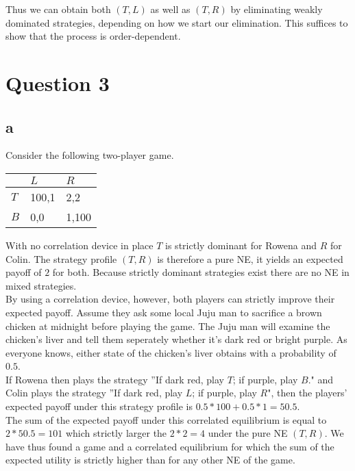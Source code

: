 \documentclass[10pt,a4paper]{article}
\begin{document}
Thus we can obtain both $(T,L)$ as well as $(T,R)$ by eliminating weakly dominated strategies, depending on how we start our elimination. This suffices to show that the process is order-dependent.

\section*{Question 3}
\subsection*{a}
Consider the following two-player game.
\begin{table}[h]
\begin{tabular}{|l|l|l|}
\hline
          & $L$ & $R$  \\ \hline
$T$     & 100,1   & 2,2 \\ \hline
$B$     & 0,0 & 1,100  \\ \hline
\end{tabular}
\end{table}
With no correlation device in place $T$ is strictly dominant for Rowena and $R$ for Colin. The strategy profile $(T,R)$ is therefore a pure NE, it yields an expected payoff of $2$ for both. Because strictly dominant strategies exist there are no NE in mixed strategies.\\
By using a correlation device, however, both players can strictly improve   their expected payoff. Assume they ask some local Juju man to sacrifice a brown chicken at midnight before playing the game. The Juju man will examine the chicken's liver and tell them seperately whether it's dark red or bright purple. As everyone knows, either state of the chicken's liver obtains with a probability of $0.5$.\\ If Rowena then plays the strategy ''If dark red, play $T$; if purple, play $B$." and Colin plays the strategy ''If dark red, play $L$; if purple, play $R$", then the players' expected payoff under this strategy profile is $0.5*100+0.5*1=50.5$.\\
The sum of the expected payoff under this correlated equilibrium is equal to $2*50.5=101$ which strictly larger the $2*2=4$ under the pure NE $(T,R)$. We have thus found a game and a correlated equilibrium for which the sum of the expected utility is strictly higher than for any other NE of the game.
\end{document}

